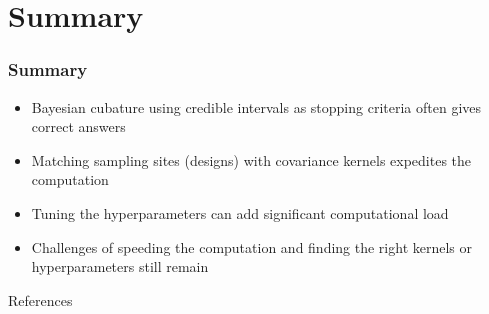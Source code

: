 \documentclass[11pt,compress,xcolor={usenames,dvipsnames},aspectratio=169]{beamer}
\begin{document}
\section{Summary}
\begin{frame}\frametitle{Summary}
	
\vspace{-5ex}
	
\begin{itemize}
	\item Bayesian cubature using credible intervals as stopping criteria often gives correct answers
	
	\item Matching sampling sites (designs) with covariance kernels expedites the computation
	
	\item Tuning the hyperparameters can add significant computational load
	
	\item Challenges of speeding the computation and finding the right kernels or hyperparameters still remain
\end{itemize}
	
\end{frame}





\thankyouframe

\begin{frame}[allowframebreaks]{References}
\printbibliography
\end{frame}
	
\end{document}
